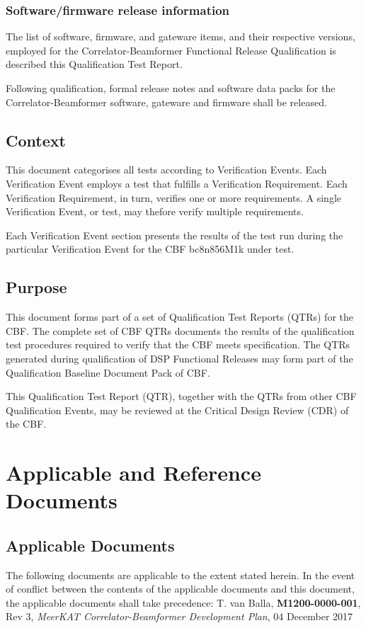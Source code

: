 \subsection{Software/firmware release information}
The list of software, firmware, and gateware items, and their respective versions, employed for the Correlator-Beamformer Functional Release Qualification is described this Qualification Test Report.

Following qualification, formal release notes and software data packs for the Correlator-Beamformer software, gateware and firmware shall be released.
\section{Context}
This document categorises all tests according to Verification Events. Each Verification Event employs a test that fulfills a Verification Requirement. Each Verification Requirement, in turn, verifies one or more requirements. A single Verification Event, or test, may thefore verify multiple requirements.

Each Verification Event section presents the results of the test run during the particular Verification Event for the CBF bc8n856M1k under test.
\section{Purpose}
This document forms part of a set of Qualification Test Reports (QTRs) for the
CBF. The complete set of CBF QTRs documents the results of the qualification
test procedures required to verify that the CBF meets specification. The QTRs
generated during qualification of DSP Functional Releases may form part of the
Qualification Baseline Document Pack of CBF.\newline

This Qualification Test Report (QTR), together with the QTRs from other CBF Qualification Events, may be reviewed at the Critical Design Review (CDR) of the CBF.
\chapter{Applicable and Reference Documents}
\section{Applicable Documents}
The following documents are applicable to the extent stated herein. In the event of conflict between the contents of the applicable documents and this document, the applicable documents shall take precedence:\newline\newline
[1]\hspace{10mm} T. van Balla, {\bf M1200-0000-001}, Rev 3, {\it MeerKAT Correlator-Beamformer Development Plan}, 04 December 2017\newline\

